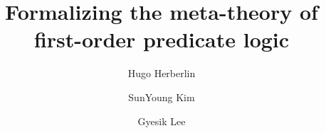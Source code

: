 \documentclass{kms-j}
\theoremstyle{plain}
\theoremstyle{remark}
\begin{document}
\title[Formalizing the meta-theory]
{Formalizing the meta-theory of first-order predicate logic}

\author[H. Herbelin]{Hugo Herberlin}
\address{Hugo Herberlin \\ Laboratoire IRIF-PPS\\ INRIA, PPS\\ 75205 Paris Cedex, France}

\author[S. Kim]{SunYoung Kim}
\address{SunYoung Kim \\ Department of Mathematics \\ Yonsei
  University \\ Seoul 03722, Korea}

\author[G. Lee]{Gyesik Lee}
\address{Gyesik Lee \\ Department of Computer Science and Engineering
  \\ Hankyong National University \\ Anseong 17579, Korea}






\newcommand{\seq}[2]{\infer{#2}{#1}}
\newcommand{\seqr}[3]{\rbm{\infer{#2}{#1}}\;\;#3}
\end{document}
